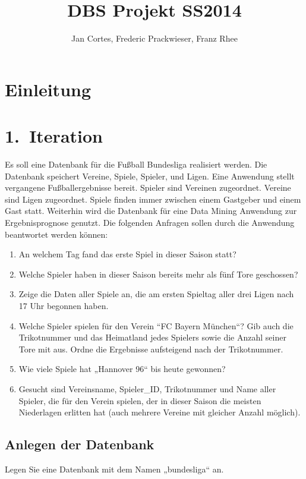 \documentclass[
10pt,
a4paper
]{scrartcl}
\title{DBS Projekt SS2014}
\author{Jan Cortes, Frederic Prackwieser, Franz Rhee}
\date{}
\begin{document}
\maketitle
\tableofcontents

\section*{Einleitung}

\section{1.~Iteration}
Es soll eine Datenbank f\"{u}r die Fußball Bundesliga realisiert werden. Die Datenbank speichert Vereine, Spiele, Spieler, und Ligen. Eine Anwendung stellt vergangene Fußballergebnisse bereit. Spieler sind Vereinen zugeordnet. Vereine sind Ligen zugeordnet. Spiele finden immer zwischen einem Gastgeber und einem Gast statt.
Weiterhin wird die Datenbank für eine Data Mining Anwendung zur Ergebnisprognose genutzt.
Die folgenden Anfragen sollen durch die Anwendung beantwortet werden k\"{o}nnen:

\begin{enumerate}

\item An welchem Tag fand das erste Spiel in dieser Saison statt?
\item Welche Spieler haben in dieser Saison bereits mehr als fünf Tore geschossen?
\item Zeige die Daten aller Spiele an, die am ersten Spieltag aller drei Ligen nach 17 Uhr begonnen haben.
\item Welche Spieler spielen für den Verein “FC Bayern München“? Gib auch die Trikotnummer und das Heimatland jedes Spielers sowie die Anzahl seiner Tore mit aus. Ordne die Ergebnisse aufsteigend nach der Trikotnummer.
\item Wie viele Spiele hat „Hannover 96“ bis heute gewonnen?
\item Gesucht sind Vereinsname, Spieler{\_}ID, Trikotnummer und Name aller Spieler, die für den Verein spielen, der in dieser Saison die meisten Niederlagen erlitten hat (auch mehrere Vereine mit gleicher Anzahl möglich).

\end{enumerate}

\subsection{Anlegen der Datenbank}
Legen Sie eine Datenbank mit dem Namen „bundesliga“ an.
\end{document}
